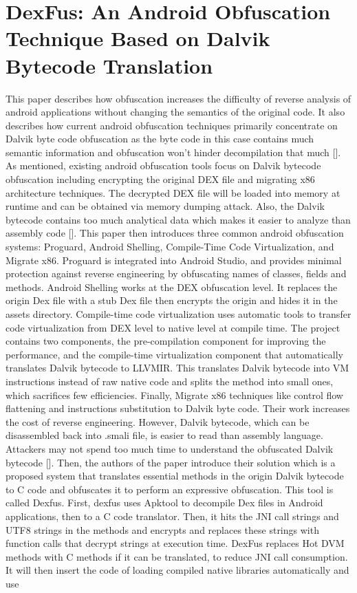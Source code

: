 \documentclass{article}
\begin{document}
\section{DexFus: An Android Obfuscation Technique Based on Dalvik Bytecode Translation}
This paper describes how obfuscation increases the difficulty of reverse analysis of android applications without changing the semantics of the original code. It also describes how current android obfuscation techniques primarily concentrate on Dalvik byte code obfuscation as the byte code in this case contains much semantic information and obfuscation won’t hinder decompilation that much [].
As mentioned, existing android obfuscation tools focus on Dalvik bytecode obfuscation including encrypting the original DEX file and migrating x86 architecture techniques. The decrypted DEX file will be loaded into memory at runtime and can be obtained via memory dumping attack. Also, the Dalvik bytecode contains too much analytical data which makes it easier to analyze than assembly code [].
This paper then introduces three common android obfuscation systems: Proguard, Android Shelling, Compile-Time Code Virtualization, and Migrate x86. Proguard is integrated into Android Studio, and provides minimal protection against reverse engineering by obfuscating names of classes, fields and methods. Android Shelling works at the DEX obfuscation level. It replaces the origin Dex file with a stub Dex file then encrypts the origin and hides it in the assets directory. Compile-time code virtualization uses automatic tools to transfer code virtualization from DEX level to native level at compile time. The project contains two components, the pre-compilation component for improving the performance, and the compile-time virtualization component that automatically translates Dalvik bytecode to LLVMIR. This translates Dalvik bytecode into VM instructions instead of raw native code and splits the method into small ones, which sacrifices few efficiencies. Finally, Migrate x86 techniques like control flow flattening and instructions substitution to Dalvik byte code. Their work increases the cost of reverse engineering. However, Dalvik bytecode, which can be disassembled back into .smali file, is easier to read than assembly language. Attackers may not spend too much time to understand the obfuscated Dalvik bytecode [].
Then, the authors of the paper introduce their solution which is a proposed system that translates essential methods in the origin Dalvik bytecode to C code and obfuscates it to perform an expressive obfuscation. This tool is called Dexfus. First, dexfus uses Apktool to decompile Dex files in Android applications, then to a C code translator. Then, it hits the JNI call strings and UTF8 strings in the methods and encrypts and replaces these strings with function calls that decrypt strings at execution time. DexFus replaces Hot DVM methods with C methods if it can be translated, to reduce JNI call consumption. It will then insert the code of loading compiled native libraries automatically and use
\end{document}
